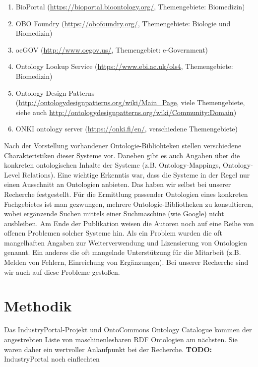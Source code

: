 \documentclass{article}
\begin{document}
\begin{enumerate}
    \item BioPortal (\url{https://bioportal.bioontology.org/}, Themengebiete: Biomedizin)
    \item OBO Foundry (\url{https://obofoundry.org/}, Themengebiete: Biologie und Biomedizin)
    \item oeGOV (\url{http://www.oegov.us/}, Themengebiet: e-Government)
    \item Ontology Lookup Service (\url{https://www.ebi.ac.uk/ols4}, Themengebiete: Biomedizin)
    \item Ontology Design Patterns (\url{http://ontologydesignpatterns.org/wiki/Main\_Page}, viele Themengebiete, siehe auch \url{http://ontologydesignpatterns.org/wiki/Community:Domain})
    \item ONKI ontology server (\url{https://onki.fi/en/}, verschiedene Themengebiete)
\end{enumerate}

Nach der Vorstellung vorhandener Ontologie-Bibliohteken stellen verschiedene Charakteristiken dieser Systeme vor.
Daneben gibt es auch Angaben über die konkreten ontologischen Inhalte der Systeme (z.B. Ontology-Mappings, Ontology-Level Relations).
Eine wichtige Erkenntis war, dass die Systeme in der Regel nur einen Ausschnitt an Ontologien anbieten.
Das haben wir selbst bei unserer Recherche festgestellt.
Für die Ermittlung passender Ontologien eines konkreten Fachgebietes ist man gezwungen, mehrere Ontologie-Bibliotheken zu konsultieren, wobei ergänzende Suchen mittels einer Suchmaschine (wie Google) nicht ausbleiben.
Am Ende der Publikation weisen die Autoren noch auf eine Reihe von offenen Problemen solcher Systeme hin.
Als ein Problem wurden die oft mangelhaften Angaben zur Weiterverwendung und Lizensierung von Ontologien genannt.
Ein anderes die oft mangelnde Unterstützung für die Mitarbeit (z.B. Melden von Fehlern, Einreichung von Ergänzungen).
Bei unserer Recherche sind wir auch auf diese Probleme gestoßen.

\section{Methodik}

Das IndustryPortal-Projekt und OntoCommons Ontology Catalogue kommen der angestrebten Liste von maschinenlesbaren RDF Ontologien am nächsten.
Sie waren daher ein wertvoller Anlaufpunkt bei der Recherche.
\textbf{TODO:} IndustryPortal noch einflechten
\end{document}
